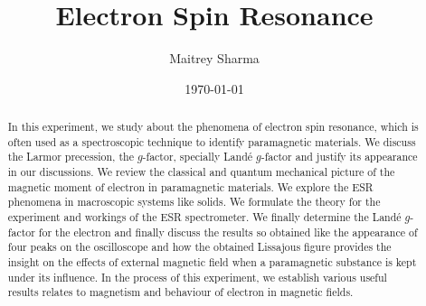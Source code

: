 \documentclass[%
 reprint,
nofootinbib,
 amsmath,amssymb,
 aps,
floatfix,
]{revtex4-2}
\begin{document}

\title{Electron Spin Resonance}%


\author{Maitrey Sharma}




\date{\today}%

\begin{abstract}
    In this experiment, we study about the phenomena of electron spin resonance, which is often used as a spectroscopic technique to identify paramagnetic materials. We discuss the Larmor precession, the $g$-factor, specially Land\'e $g$-factor and justify its appearance in our discussions. We review the classical and quantum mechanical picture of the magnetic moment of electron in paramagnetic materials. We explore the ESR phenomena in macroscopic systems like solids. We formulate the theory for the experiment and workings of the ESR spectrometer. We finally determine the Land\'e $g$-factor for the electron and finally discuss the results so obtained like the appearance of four peaks on the oscilloscope and how the obtained Lissajous figure provides the insight on the effects of external magnetic field when a paramagnetic substance is kept under its influence. In the process of this experiment, we establish various useful results relates to magnetism and behaviour of electron in magnetic fields.
\end{abstract}

\maketitle

\end{document}
